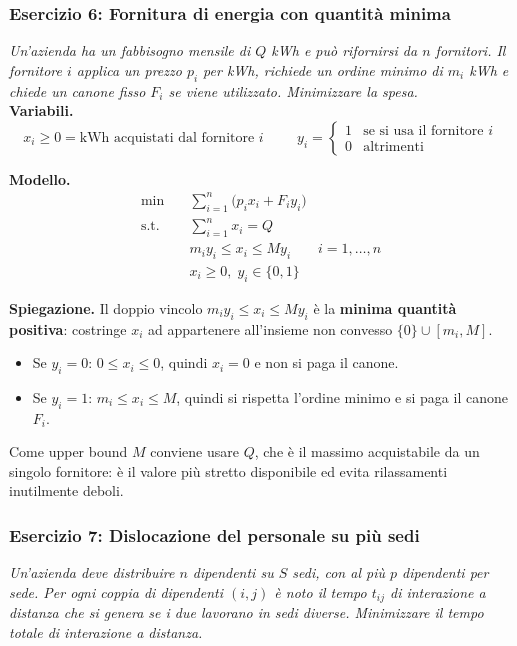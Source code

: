 \documentclass[12pt]{extarticle} %
\begin{document}
\subsubsection{Esercizio 6: Fornitura di energia con quantità minima}
\textit{Un'azienda ha un fabbisogno mensile di $Q$ kWh e può rifornirsi da $n$ fornitori. Il fornitore $i$ applica un prezzo $p_i$ per kWh, richiede un ordine minimo di $m_i$ kWh e chiede un canone fisso $F_i$ se viene utilizzato. Minimizzare la spesa.}\\

\noindent\textbf{Variabili.}
\[
x_i \ge 0 = \text{kWh acquistati dal fornitore } i
\hspace{1cm}
y_i = \begin{cases} 1 & \text{se si usa il fornitore } i\\ 0 & \text{altrimenti}\end{cases}
\]

\noindent\textbf{Modello.}
\[
\begin{aligned}
\min \quad & \sum_{i=1}^n \big( p_i x_i + F_i y_i \big) \\
\text{s.t.} \quad & \sum_{i=1}^n x_i = Q \\
& m_i y_i \le x_i \le M y_i & i=1,\dots,n \\
& x_i \ge 0, \; y_i \in \{0,1\}
\end{aligned}
\]

\noindent\textbf{Spiegazione.} Il doppio vincolo $m_i y_i \le x_i \le M y_i$ è la \textbf{minima quantità positiva}: costringe $x_i$ ad appartenere all'insieme non convesso $\{0\} \cup [m_i, M]$.
\begin{itemize}
    \item Se $y_i = 0$: $0 \le x_i \le 0$, quindi $x_i = 0$ e non si paga il canone.
    \item Se $y_i = 1$: $m_i \le x_i \le M$, quindi si rispetta l'ordine minimo e si paga il canone $F_i$.
\end{itemize}
Come upper bound $M$ conviene usare $Q$, che è il massimo acquistabile da un singolo fornitore: è il valore più stretto disponibile ed evita rilassamenti inutilmente deboli.

\subsubsection{Esercizio 7: Dislocazione del personale su più sedi}
\textit{Un'azienda deve distribuire $n$ dipendenti su $S$ sedi, con al più $p$ dipendenti per sede. Per ogni coppia di dipendenti $(i,j)$ è noto il tempo $t_{ij}$ di interazione a distanza che si genera se i due lavorano in sedi diverse. Minimizzare il tempo totale di interazione a distanza.}\\
\end{document}
